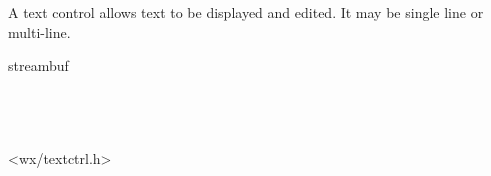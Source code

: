 
\section{}\label{wxtextctrl}

A text control allows text to be displayed and edited. It may be
single line or multi-line.


streambuf\\
\\
\\
\\


<wx/textctrl.h>


